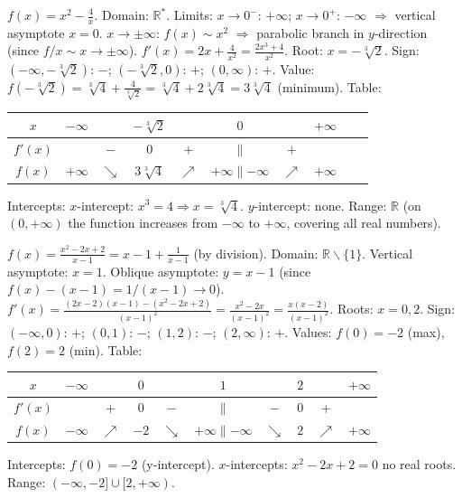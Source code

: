 \documentclass[11pt]{article}
\def\setminus{\mathbin{\backslash}}\let\smallsetminus\setminus
\begin{document}
\begin{corrige}[Exercise 2]
\(f(x)=x^2-\frac{4}{x}\).
Domain: \(\mathbb{R}^*\).
Limits: \(x\to0^-\): \(+\infty\); \(x\to0^+\): \(-\infty\) \(\Rightarrow\) vertical asymptote \(x=0\).
\(x\to\pm\infty\): \(f(x)\sim x^2\) \(\Rightarrow\) parabolic branch in \(y\)-direction (since \(f/x \sim x \to \pm\infty\)).
\(f'(x)=2x+\frac{4}{x^2}=\frac{2x^3+4}{x^2}\). Root: \(x=-\sqrt[3]{2}\).
Sign: \((-∞,-\sqrt[3]{2})\): \(-\); \((-\sqrt[3]{2},0)\): \(+\); \((0,∞)\): \(+\).
Value: \(f(-\sqrt[3]{2}) = \sqrt[3]{4} + \frac{4}{\sqrt[3]{2}} = \sqrt[3]{4} + 2\sqrt[3]{4} = 3\sqrt[3]{4}\) (minimum).
Table:
\begin{center}
\begin{tabular}{|c|ccccccccc|}\hline
\(x\) & \(-\infty\) & & \(-\sqrt[3]{2}\) & & \(0\) & & \(+\infty\) \\ \hline
\(f'(x)\) & & \(-\) & \(0\) & \(+\) & \(\parallel\) & \(+\) & \\ \hline
\(f(x)\) & \(+\infty\) & \(\searrow\) & \(3\sqrt[3]{4}\) & \(\nearrow\) & \(+\infty\parallel-\infty\) & \(\nearrow\) & \(+\infty\) \\ \hline
\end{tabular}
\end{center}
Intercepts: \(x\)-intercept: \(x^3=4 \Rightarrow x=\sqrt[3]{4}\). \(y\)-intercept: none.
Range: \(\mathbb{R}\) (on \((0,+\infty)\) the function increases from \(-\infty\) to \(+\infty\), covering all real numbers).
\end{corrige}

\begin{corrige}[Exercise 3]
\(f(x)=\frac{x^2-2x+2}{x-1} = x-1 + \frac{1}{x-1}\) (by division).
Domain: \(\mathbb{R}\setminus\{1\}\).
Vertical asymptote: \(x=1\).
Oblique asymptote: \(y=x-1\) (since \(f(x)-(x-1)=1/(x-1)\to0\)).
\(f'(x)=\frac{(2x-2)(x-1)-(x^2-2x+2)}{(x-1)^2}=\frac{x^2-2x}{(x-1)^2}=\frac{x(x-2)}{(x-1)^2}\).
Roots: \(x=0,2\).
Sign: \((-∞,0)\): \(+\); \((0,1)\): \(-\); \((1,2)\): \(-\); \((2,∞)\): \(+\).
Values: \(f(0)=-2\) (max), \(f(2)=2\) (min).
Table:
\begin{center}
\begin{tabular}{|c|ccccccccc|}\hline
\(x\) & \(-\infty\) & & \(0\) & & \(1\) & & \(2\) & & \(+\infty\) \\ \hline
\(f'(x)\) & & \(+\) & \(0\) & \(-\) & \(\parallel\) & \(-\) & \(0\) & \(+\) & \\ \hline
\(f(x)\) & \(-\infty\) & \(\nearrow\) & \(-2\) & \(\searrow\) & \(+\infty\parallel-\infty\) & \(\searrow\) & \(2\) & \(\nearrow\) & \(+\infty\) \\ \hline
\end{tabular}
\end{center}
Intercepts: \(f(0)=-2\) (y-intercept). \(x\)-intercepts: \(x^2-2x+2=0\) no real roots.
Range: \((-\infty,-2] \cup [2,+\infty)\).
\end{corrige}
\end{document}
